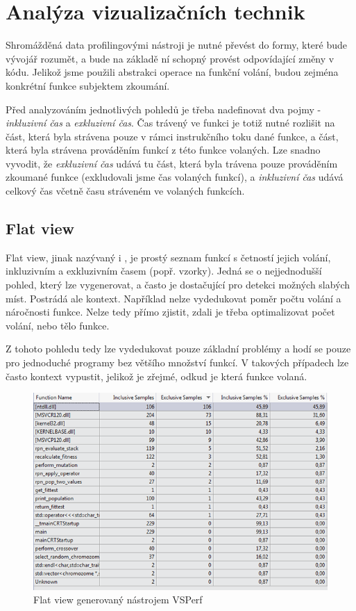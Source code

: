 \documentclass[czech,BP]{thesiskiv}
\begin{document}
\newpage

\chapter{Analýza vizualizačních technik}

Shromážděná data profilingovými nástroji je nutné převést do formy, které bude vývojář rozumět, a bude na základě ní schopný provést odpovídající změny v kódu. Jelikož jsme použili abstrakci operace na funkční volání, budou zejména konkrétní funkce subjektem zkoumání.

Před analyzováním jednotlivých pohledů je třeba nadefinovat dva pojmy - \emph{inkluzivní čas} a \emph{exkluzivní čas}. Čas trávený ve funkci je totiž nutné rozlišit na část, která byla strávena pouze v rámci instrukčního toku dané funkce, a část, která byla strávena prováděním funkcí z této funkce volaných. Lze snadno vyvodit, že \emph{exkluzivní čas} udává tu část, která byla trávena pouze prováděním zkoumané funkce (exkludovali jsme čas volaných funkcí), a \emph{inkluzivní čas} udává celkový čas včetně času stráveném ve volaných funkcích.

\section{Flat view}

Flat view\cite{flatcite}, jinak nazývaný i , je prostý seznam funkcí s četností jejich volání, inkluzivním a exkluzivním časem (popř. vzorky). Jedná se o nejjednodušší pohled, který lze vygenerovat, a často je dostačující pro detekci možných slabých míst. Postrádá ale kontext. Například nelze vydedukovat poměr počtu volání a náročnosti funkce. Nelze tedy přímo zjistit, zdali je třeba optimalizovat počet volání, nebo tělo funkce.

Z tohoto pohledu tedy lze vydedukovat pouze základní problémy a hodí se pouze pro jednoduché programy bez většího množství funkcí. V takových případech lze často kontext vypustit, jelikož je zřejmé, odkud je která funkce volaná.

\begin{figure}[h]
    \centering
    \includegraphics[interpolate,width=1.0\textwidth]{img/prof_flatview.png}
    \caption{Flat view generovaný nástrojem VSPerf}
    \label{obr:flatview}
\end{figure}
\end{document}
